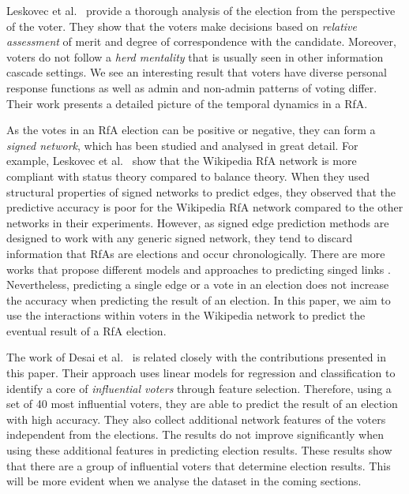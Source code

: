 Leskovec et al.\ \cite{leskovec2010governance} provide a thorough analysis of the election from the perspective of the voter. They show that the voters make decisions based on \textit{relative assessment} of merit and degree of correspondence with the candidate. Moreover, voters do not follow a \textit{herd mentality} that is usually seen in other information cascade settings. We see an interesting result that voters have diverse personal response functions as well as admin and non-admin patterns of voting differ. Their work presents a detailed picture of the temporal dynamics in a RfA.

As the votes in an RfA election can be positive or negative, they can form a \textit{signed network}, which has been studied and analysed in great detail. For example, Leskovec et al.\ \cite{leskovecSigned} show that the Wikipedia RfA network is more compliant with status theory compared to balance theory. When they used structural properties of signed networks to predict edges, they observed that the predictive accuracy is poor for the Wikipedia RfA network compared to the other networks in their experiments. However, as signed edge prediction methods are designed to work with any generic signed network, they tend to discard information that RfAs are elections and occur chronologically. There are more works that propose different models and approaches to predicting singed links \cite{agrawal2013link,hsieh2012low,gu2019link,chiang2011exploiting,Jiliang2015Negative,chiang2014prediction}. Nevertheless, predicting a single edge or a vote in an election does not increase the accuracy when predicting the result of an election. In this paper, we aim to use the interactions within voters in the Wikipedia network to predict the eventual result of a RfA election.

The work of Desai et al.\ \cite{desai2014result} is related closely with the contributions presented in this paper. Their approach uses linear models for regression and classification to identify a core of \textit{influential voters} through feature selection. Therefore, using a set of 40 most influential voters, they are able to predict the result of an election with high accuracy. They also collect additional network features of the voters independent from the elections. The results do not improve significantly when using these additional features in predicting election results. These results show that there are a group of influential voters that determine election results. This will be more evident when we analyse the dataset in the coming sections.
